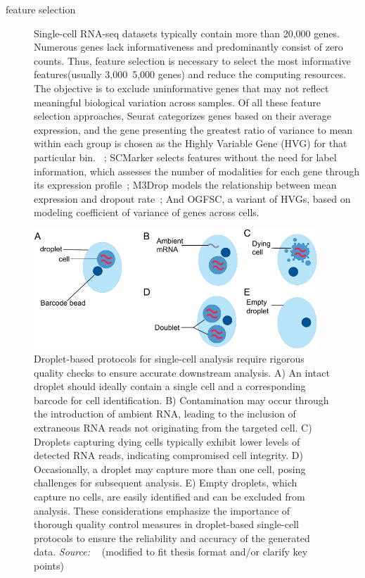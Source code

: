 \begin{description}
	\item[feature selection] Single-cell RNA-seq datasets typically contain more than 20,000 genes. Numerous genes lack informativeness and predominantly consist of zero counts. Thus, feature selection is necessary to select the most informative features(usually 3,000~5,000 genes) and reduce the computing resources. The objective is to exclude uninformative genes that may not reflect meaningful biological variation across samples. Of all these feature selection approaches, Seurat categorizes genes based on their average expression, and the gene presenting the greatest ratio of variance to mean within each group is chosen as the Highly Variable Gene (HVG) for that particular bin. ~\citep{stuart2019seurat3}; SCMarker selects features without the need for label information, which assesses the number of modalities for each gene through its expression profile~\citep{wang2019scmarker}; M3Drop models the relationship between mean expression and dropout rate~\citep{andrews2019m3drop}; And OGFSC, a variant of HVGs, based on modeling coefficient of variance of genes across cells. ~\citep{hao2019OGFSC}
\end{description}

\begin{figure}[!ht]
	\centering
	\includegraphics[width=0.95\textwidth]{QC_cells/fig}
	\vspace{0.1cm}
	\caption[Droplets-based sequencing of dying cells, doublet and empty droplet .]{Droplet-based protocols for single-cell analysis require rigorous quality checks to ensure accurate downstream analysis. A) An intact droplet should ideally contain a single cell and a corresponding barcode for cell identification. B) Contamination may occur through the introduction of ambient RNA, leading to the inclusion of extraneous RNA reads not originating from the targeted cell. C) Droplets capturing dying cells typically exhibit lower levels of detected RNA reads, indicating compromised cell integrity. D) Occasionally, a droplet may capture more than one cell, posing challenges for subsequent analysis. E) Empty droplets, which capture no cells, are easily identified and can be excluded from analysis. These considerations emphasize the importance of thorough quality control measures in droplet-based single-cell protocols to ensure the reliability and accuracy of the generated data. \emph{Source: ~\cite{heumos2023best}} (modified to fit thesis format and/or clarify key points)}
	\label{fig:QCcells}
\end{figure}
